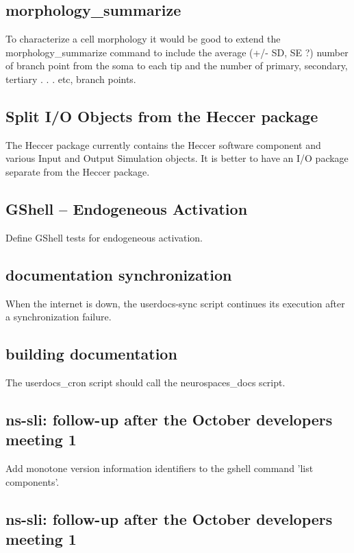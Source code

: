 \documentclass[12pt]{article}
\begin{document}
\subsection{morphology\_summarize}

To characterize a cell morphology it would be good to extend the
morphology\_summarize command to include the average (+/- SD, SE ?)
number of branch point from the soma to each tip and the number of
primary, secondary, tertiary . . . etc, branch points.


\subsection{Split I/O Objects from the Heccer package}

The Heccer package currently contains the Heccer software component
and various Input and Output Simulation objects.  It is better to have
an I/O package separate from the Heccer package.


\subsection{GShell -- Endogeneous Activation}

Define GShell tests for endogeneous activation.


\subsection{documentation synchronization}

When the internet is down, the userdocs-sync script continues its
execution after a synchronization failure.


\subsection{building documentation}

The userdocs\_cron script should call the neurospaces\_docs script.


\subsection{ns-sli: follow-up after the October developers meeting 1}

Add monotone version information identifiers to the gshell command
'list components'.


\subsection{ns-sli: follow-up after the October developers meeting 1}
\end{document}
